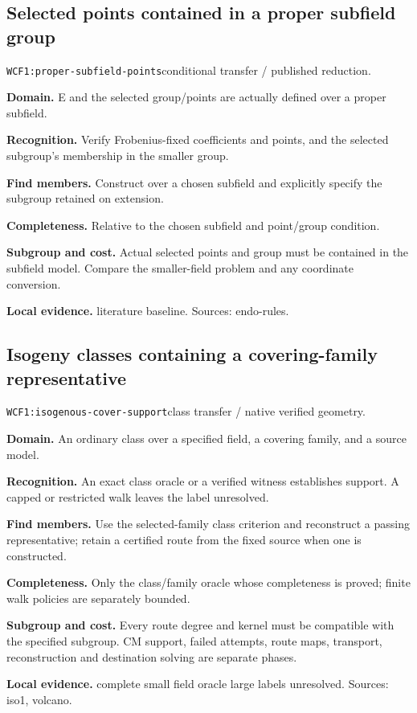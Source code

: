 \documentclass[10pt]{article}
\begin{document}
\subsection{Selected points contained in a proper subfield group}
\texttt{WCF1:proper-subfield-points}\quad conditional transfer / published reduction.\par
\textbf{Domain.} E and the selected group/points are actually defined over a proper subfield.\par
\textbf{Recognition.} Verify Frobenius-fixed coefficients and points, and the selected subgroup's membership in the smaller group.\par
\textbf{Find members.} Construct over a chosen subfield and explicitly specify the subgroup retained on extension.\par
\textbf{Completeness.} Relative to the chosen subfield and point/group condition.\par
\textbf{Subgroup and cost.} Actual selected points and group must be contained in the subfield model. Compare the smaller-field problem and any coordinate conversion.\par
\textbf{Local evidence.} literature baseline. Sources: endo-rules.
\subsection{Isogeny classes containing a covering-family representative}
\texttt{WCF1:isogenous-cover-support}\quad class transfer / native verified geometry.\par
\textbf{Domain.} An ordinary class over a specified field, a covering family, and a source model.\par
\textbf{Recognition.} An exact class oracle or a verified witness establishes support. A capped or restricted walk leaves the label unresolved.\par
\textbf{Find members.} Use the selected-family class criterion and reconstruct a passing representative; retain a certified route from the fixed source when one is constructed.\par
\textbf{Completeness.} Only the class/family oracle whose completeness is proved; finite walk policies are separately bounded.\par
\textbf{Subgroup and cost.} Every route degree and kernel must be compatible with the specified subgroup. CM support, failed attempts, route maps, transport, reconstruction and destination solving are separate phases.\par
\textbf{Local evidence.} complete small field oracle large labels unresolved. Sources: iso1, volcano.
\end{document}
